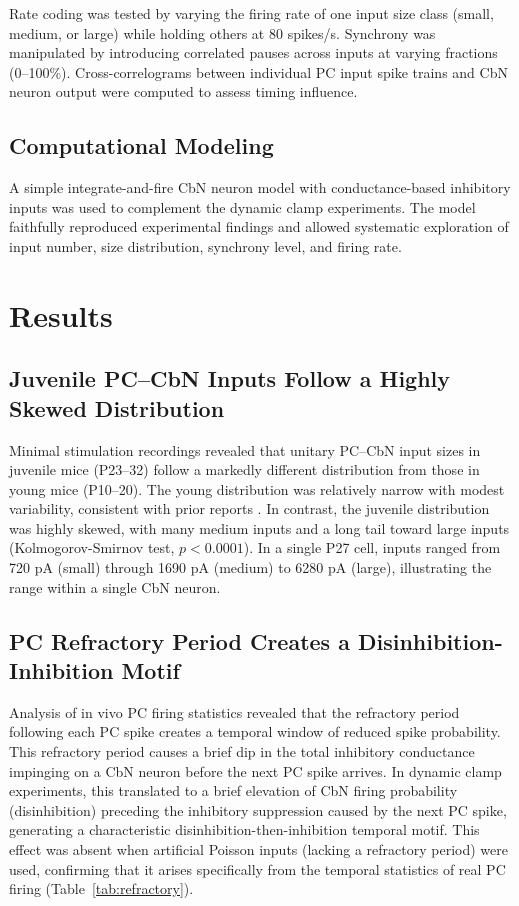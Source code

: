 \documentclass[12pt]{article}
\begin{document}
Rate coding was tested by varying the firing rate of one input size class (small, medium, or large) while holding others at 80 spikes/s. Synchrony was manipulated by introducing correlated pauses across inputs at varying fractions (0--100\%). Cross-correlograms between individual PC input spike trains and CbN neuron output were computed to assess timing influence.

\subsection{Computational Modeling}

A simple integrate-and-fire CbN neuron model with conductance-based inhibitory inputs was used to complement the dynamic clamp experiments. The model faithfully reproduced experimental findings and allowed systematic exploration of input number, size distribution, synchrony level, and firing rate.

\section{Results}

\subsection{Juvenile PC--CbN Inputs Follow a Highly Skewed Distribution}

Minimal stimulation recordings revealed that unitary PC--CbN input sizes in juvenile mice (P23--32) follow a markedly different distribution from those in young mice (P10--20). The young distribution was relatively narrow with modest variability, consistent with prior reports \citep{person2012purkinje}. In contrast, the juvenile distribution was highly skewed, with many medium inputs and a long tail toward large inputs (Kolmogorov-Smirnov test, $p < 0.0001$). In a single P27 cell, inputs ranged from 720 pA (small) through 1690 pA (medium) to 6280 pA (large), illustrating the range within a single CbN neuron.

\subsection{PC Refractory Period Creates a Disinhibition-Inhibition Motif}

Analysis of in vivo PC firing statistics revealed that the refractory period following each PC spike creates a temporal window of reduced spike probability. This refractory period causes a brief dip in the total inhibitory conductance impinging on a CbN neuron before the next PC spike arrives. In dynamic clamp experiments, this translated to a brief elevation of CbN firing probability (disinhibition) preceding the inhibitory suppression caused by the next PC spike, generating a characteristic disinhibition-then-inhibition temporal motif. This effect was absent when artificial Poisson inputs (lacking a refractory period) were used, confirming that it arises specifically from the temporal statistics of real PC firing (Table~\ref{tab:refractory}).
\end{document}

